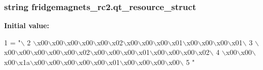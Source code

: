 \subsubsection[{qt\+\_\+resource\+\_\+struct}]{\setlength{\rightskip}{0pt plus 5cm}string fridgemagnets\+\_\+rc2.\+qt\+\_\+resource\+\_\+struct}\label{namespacefridgemagnets__rc2_ae36234a2697fccc2f5c7b491c5dbe6a9}
{\bfseries Initial value\+:}
\begin{DoxyCode}
1 = \textcolor{stringliteral}{"\(\backslash\)}
2 \textcolor{stringliteral}{\(\backslash\)x00\(\backslash\)x00\(\backslash\)x00\(\backslash\)x00\(\backslash\)x00\(\backslash\)x02\(\backslash\)x00\(\backslash\)x00\(\backslash\)x00\(\backslash\)x01\(\backslash\)x00\(\backslash\)x00\(\backslash\)x00\(\backslash\)x01\(\backslash\)}
3 \textcolor{stringliteral}{\(\backslash\)x00\(\backslash\)x00\(\backslash\)x00\(\backslash\)x00\(\backslash\)x00\(\backslash\)x02\(\backslash\)x00\(\backslash\)x00\(\backslash\)x00\(\backslash\)x01\(\backslash\)x00\(\backslash\)x00\(\backslash\)x00\(\backslash\)x02\(\backslash\)}
4 \textcolor{stringliteral}{\(\backslash\)x00\(\backslash\)x00\(\backslash\)x00\(\backslash\)x1a\(\backslash\)x00\(\backslash\)x00\(\backslash\)x00\(\backslash\)x00\(\backslash\)x00\(\backslash\)x01\(\backslash\)x00\(\backslash\)x00\(\backslash\)x00\(\backslash\)x00\(\backslash\)}
5 \textcolor{stringliteral}{"}
\end{DoxyCode}
